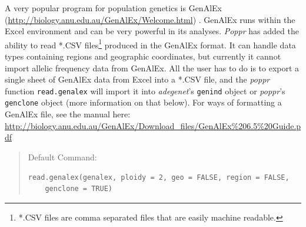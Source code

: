 \documentclass[letterpaper]{article}\usepackage[]{graphicx}\usepackage[]{color}
\makeatletter
\newenvironment{kframe}{%
 \def\at@end@of@kframe{}%
 \ifinner\ifhmode%
  \def\at@end@of@kframe{\end{minipage}}%
  \begin{minipage}{\columnwidth}%
 \fi\fi%
 \def\FrameCommand##1{\hskip\@totalleftmargin \hskip-\fboxsep
 \colorbox{shadecolor}{##1}\hskip-\fboxsep
     \hskip-\linewidth \hskip-\@totalleftmargin \hskip\columnwidth}%
 \MakeFramed {\advance\hsize-\width
   \@totalleftmargin\z@ \linewidth\hsize
   \@setminipage}}%
 {\par\unskip\endMakeFramed%
 \at@end@of@kframe}
\newenvironment{knitrout}{}{} %
\newcommand{\tab}{\hspace*{1em}}
\makeatother
\begin{document}
\tab\tab A very popular program for population genetics is GenAlEx (\url{http://biology.anu.edu.au/GenAlEx/Welcome.html}) \cite{Peakall:2012, Peakall:2006}. GenAlEx runs within the Excel environment and can be very powerful in its analyses. \textit{Poppr} has added the ability to read *.CSV files\footnote{*.CSV files are comma separated files that are easily machine readable.} produced in the GenAlEx format. It can handle data types containing regions and geographic coordinates, but currently it cannot import allelic frequency data from GenAlEx. All the user has to do is to export a single sheet of GenAlEx data from Excel into a *.CSV file, and the \textit{poppr} function \texttt{read.genalex} will import it into \textit{adegenet}'s \texttt{genind} object or \textit{poppr}'s \texttt{genclone} object (more information on that below). For ways of formatting a GenAlEx file, see the manual here: \url{http://biology.anu.edu.au/GenAlEx/Download_files/GenAlEx\%206.5\%20Guide.pdf}
\begin{quote}
Default Command:
\begin{knitrout}
\color{fgcolor}\begin{kframe}
\begin{verbatim}
read.genalex(genalex, ploidy = 2, geo = FALSE, region = FALSE, 
    genclone = TRUE)
\end{verbatim}
\end{kframe}
\end{knitrout}

\end{quote}
\end{document}
